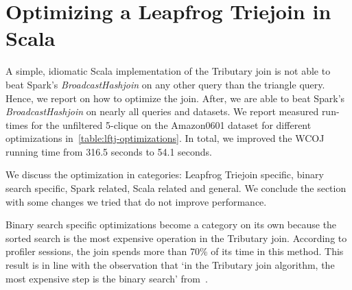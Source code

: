 \section{Optimizing a Leapfrog Triejoin in Scala}\label{sec:lftj-optimizations}

A simple, idiomatic Scala implementation of the Tributary join is not able to beat Spark's \textit{BroadcastHashjoin}
on any other query than the triangle query.
Hence, we report on how to optimize the join.
After, we are able to beat Spark's \textit{BroadcastHashjoin} on nearly all queries and datasets.
We report measured run-times for the unfiltered 5-clique on the Amazon0601 dataset for different optimizations
in~\cref{table:lftj-optimizations}.
In total, we improved the \textsc{WCOJ} running time from 316.5 seconds to 54.1 seconds.

We discuss the optimization in categories: Leapfrog Triejoin specific, binary search specific, Spark related, Scala related and general.
We conclude the section with some changes we tried that do not improve performance.

Binary search specific optimizations become a category on its own because the sorted search is the most expensive operation in the Tributary join.
According to profiler sessions, the join spends more than 70\% of its time in this method.
This result is in line with the observation that `in the Tributary join algorithm, the most expensive step is the binary search' from~\cite{myria-detailed}.

